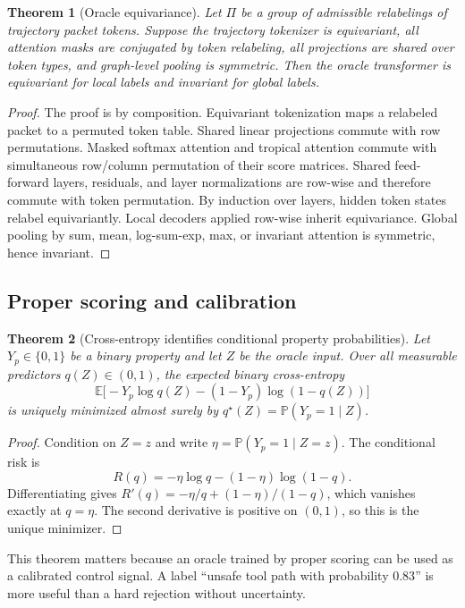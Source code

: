 \documentclass[11pt]{article}
\newtheorem{theorem}{Theorem}[section]
\numberwithin{equation}{section}
\begin{document}
\begin{theorem}[Oracle equivariance]
Let $\Pi$ be a group of admissible relabelings of trajectory packet tokens. Suppose the trajectory tokenizer is equivariant, all attention masks are conjugated by token relabeling, all projections are shared over token types, and graph-level pooling is symmetric. Then the oracle transformer is equivariant for local labels and invariant for global labels.
\end{theorem}
\begin{proof}
The proof is by composition. Equivariant tokenization maps a relabeled packet to a permuted token table. Shared linear projections commute with row permutations. Masked softmax attention and tropical attention commute with simultaneous row/column permutation of their score matrices. Shared feed-forward layers, residuals, and layer normalizations are row-wise and therefore commute with token permutation. By induction over layers, hidden token states relabel equivariantly. Local decoders applied row-wise inherit equivariance. Global pooling by sum, mean, log-sum-exp, max, or invariant attention is symmetric, hence invariant.
\end{proof}

\subsection{Proper scoring and calibration}
\begin{theorem}[Cross-entropy identifies conditional property probabilities]
Let $Y_p\in\{0,1\}$ be a binary property and let $Z$ be the oracle input. Over all measurable predictors $q(Z)\in(0,1)$, the expected binary cross-entropy
\begin{equation}
\mathbb{E}\big[-Y_p\log q(Z)-(1-Y_p)\log(1-q(Z))\big]
\end{equation}
 is uniquely minimized almost surely by $q^\star(Z)=\mathbb{P}(Y_p=1\mid Z)$.
\end{theorem}
\begin{proof}
Condition on $Z=z$ and write $\eta=\mathbb{P}(Y_p=1\mid Z=z)$. The conditional risk is
\begin{equation}
R(q)=-\eta\log q-(1-\eta)\log(1-q).
\end{equation}
Differentiating gives $R'(q)=-\eta/q+(1-\eta)/(1-q)$, which vanishes exactly at $q=\eta$. The second derivative is positive on $(0,1)$, so this is the unique minimizer.
\end{proof}

This theorem matters because an oracle trained by proper scoring can be used as a calibrated control signal. A label ``unsafe tool path with probability $0.83$'' is more useful than a hard rejection without uncertainty.
\end{document}
